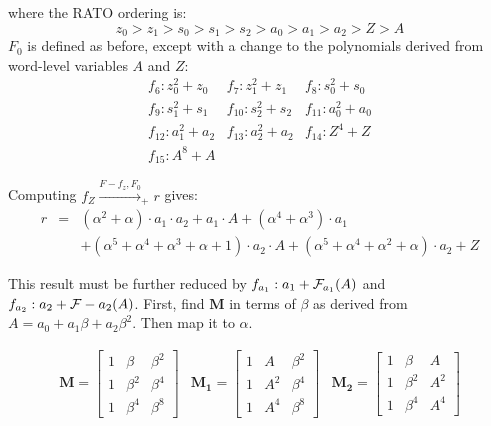 \begin{Example}
{where the RATO ordering is:
\begin{equation}
z_0 > z_1 > s_0 > s_1 > s_2 > a_0 > a_1 > a_2 > Z > A
\end{equation}
$F_0$ is defined as before, except with a change to the polynomials derived from word-level 
variables $A$ and $Z$:
\begin{eqnarray}
f_6: z_0^2+z_0 & f_7: z_1^2+z_1 & f_8: s_0^2+s_0 \nonumber \\
f_9: s_1^2+s_1 & f_{10}: s_2^2+s_2 & f_{11}: a_0^2+a_0 \nonumber \\
f_{12}: a_1^2+a_2 & f_{13}: a_2^2+a_2 & f_{14}: Z^4+Z \nonumber \\
f_{15}: A^8+A & & 
\end{eqnarray}

Computing $f_Z\xrightarrow{F-{f_z},F_0}_+ r$ gives:
\begin{eqnarray}
r&=& (\alpha^2+\alpha)\cdot a_1\cdot a_2+a_1\cdot A+(\alpha^4+\alpha^3)\cdot a_1 \nonumber \\
&&+(\alpha^5+\alpha^4+\alpha^3+\alpha+1)\cdot a_2\cdot A+(\alpha^5+\alpha^4+\alpha^2+\alpha)\cdot a_2+Z
\end{eqnarray}

This result must be further reduced by $f_{a_1}: a_1 + {\mathcal{F}}_{a_1}(A)$ and $f_{a_2}: a_2 + {\mathcal{F}}-{a_2}(A)$. 
First, find $\mathbf{M}$ in terms of $\beta$ as derived from $A=a_0+a_1\beta+a_2\beta^2$.
Then map it to $\alpha$.  

\begin{eqnarray}
\mathbf{M}=
\begin{bmatrix}
1      &   \beta   & \beta^2  \\
1      &   \beta^2 & \beta^4  \\
1      &   \beta^4 & \beta^8
\end{bmatrix} & 
\mathbf{M_1}=
\begin{bmatrix}
1      &   A   & \beta^2  \\
1      &   A^2 & \beta^4  \\
1      &   A^4 & \beta^8
\end{bmatrix} &
\mathbf{M_2}=
\begin{bmatrix}
1      &   \beta   & A  \\
1      &   \beta^2 & A^2  \\
1      &   \beta^4 & A^4
\end{bmatrix}
\end{eqnarray}

}
\end{Example}
